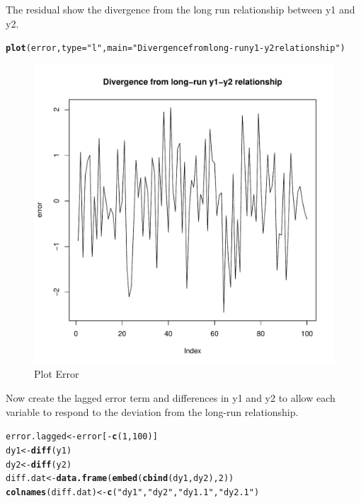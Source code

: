\documentclass{article}\usepackage{graphicx, color}
\makeatletter
\def\maxwidth{ %
  \ifdim\Gin@nat@width>\linewidth
    \linewidth
  \else
    \Gin@nat@width
  \fi
}
\newcommand{\hlfunctioncall}[1]{\textcolor[rgb]{0.501960784313725,0,0.329411764705882}{\textbf{#1}}}%
\newcommand{\hlstring}[1]{\textcolor[rgb]{0.6,0.6,1}{#1}}%
\newenvironment{kframe}{%
 \def\at@end@of@kframe{}%
 \ifinner\ifhmode%
  \def\at@end@of@kframe{\end{minipage}}%
  \begin{minipage}{\columnwidth}%
 \fi\fi%
 \def\FrameCommand##1{\hskip\@totalleftmargin \hskip-\fboxsep
 \colorbox{shadecolor}{##1}\hskip-\fboxsep
     \hskip-\linewidth \hskip-\@totalleftmargin \hskip\columnwidth}%
 \MakeFramed {\advance\hsize-\width
   \@totalleftmargin\z@ \linewidth\hsize
   \@setminipage}}%
 {\par\unskip\endMakeFramed%
 \at@end@of@kframe}
\newenvironment{knitrout}{}{} %
\makeatother
\begin{document}
The residual show the divergence from the long run relationship between y1 and y2. 
\begin{knitrout}
\color{fgcolor}\begin{kframe}
\begin{alltt}
\hlfunctioncall{plot}(error, type = \hlstring{"l"}, main = \hlstring{"Divergence from long-run y1-y2 relationship"})
\end{alltt}
\end{kframe}\begin{figure}[]

\includegraphics[width=\maxwidth]{figure/Plot-EG2} \caption[Plot Error]{Plot Error\label{fig:Plot-EG2}}
\end{figure}


\end{knitrout}

Now create the lagged error term and differences in y1 and y2 to allow each variable to respond to the deviation from the long-run relationship.  
\begin{knitrout}
\color{fgcolor}\begin{kframe}
\begin{alltt}
error.lagged <- error[-\hlfunctioncall{c}(1, 100)]
dy1 <- \hlfunctioncall{diff}(y1)
dy2 <- \hlfunctioncall{diff}(y2)
diff.dat <- \hlfunctioncall{data.frame}(\hlfunctioncall{embed}(\hlfunctioncall{cbind}(dy1, dy2), 2))
\hlfunctioncall{colnames}(diff.dat) <- \hlfunctioncall{c}(\hlstring{"dy1"}, \hlstring{"dy2"}, \hlstring{"dy1.1"}, \hlstring{"dy2.1"})
\end{alltt}
\end{kframe}
\end{knitrout}
\end{document}
